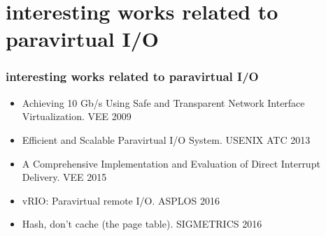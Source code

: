 \documentclass[aspectratio=169]{beamer}
\begin{document}
\section{interesting works related to paravirtual I/O}
\begin{frame}
\frametitle{interesting works related to paravirtual I/O}
\begin{itemize}
\item Achieving 10 Gb/s Using Safe and Transparent Network Interface Virtualization. VEE 2009
\item Efficient and Scalable Paravirtual I/O System. USENIX ATC 2013
\item A Comprehensive Implementation and Evaluation of Direct Interrupt Delivery. VEE 2015
\item vRIO: Paravirtual remote I/O.  ASPLOS 2016
\item Hash, don't cache (the page table). SIGMETRICS 2016
\end{itemize}
\end{frame}

\end{document}
